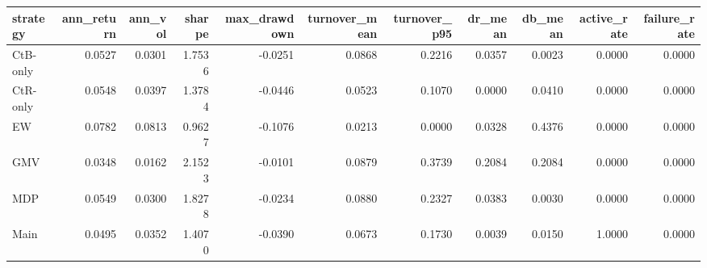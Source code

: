 \begin{tabular}{lrrrrrrrrrr}
\toprule
strategy & ann_return & ann_vol & sharpe & max_drawdown & turnover_mean & turnover_p95 & dr_mean & db_mean & active_rate & failure_rate \\
\midrule
CtB-only & 0.0527 & 0.0301 & 1.7536 & -0.0251 & 0.0868 & 0.2216 & 0.0357 & 0.0023 & 0.0000 & 0.0000 \\
CtR-only & 0.0548 & 0.0397 & 1.3784 & -0.0446 & 0.0523 & 0.1070 & 0.0000 & 0.0410 & 0.0000 & 0.0000 \\
EW & 0.0782 & 0.0813 & 0.9627 & -0.1076 & 0.0213 & 0.0000 & 0.0328 & 0.4376 & 0.0000 & 0.0000 \\
GMV & 0.0348 & 0.0162 & 2.1523 & -0.0101 & 0.0879 & 0.3739 & 0.2084 & 0.2084 & 0.0000 & 0.0000 \\
MDP & 0.0549 & 0.0300 & 1.8278 & -0.0234 & 0.0880 & 0.2327 & 0.0383 & 0.0030 & 0.0000 & 0.0000 \\
Main & 0.0495 & 0.0352 & 1.4070 & -0.0390 & 0.0673 & 0.1730 & 0.0039 & 0.0150 & 1.0000 & 0.0000 \\
\bottomrule
\end{tabular}
